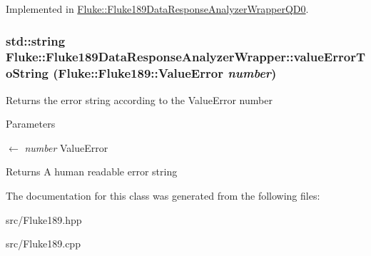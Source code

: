 Implemented in \hyperlink{classFluke_1_1Fluke189DataResponseAnalyzerWrapperQD0_a97829a1943b858fd09c4fef1d6d61420}{Fluke::Fluke189DataResponseAnalyzerWrapperQD0}.\hypertarget{classFluke_1_1Fluke189DataResponseAnalyzerWrapper_ac6af92576728d360cf3e0d462d07dd27}{
\subsubsection[{valueErrorToString}]{\setlength{\rightskip}{0pt plus 5cm}std::string Fluke::Fluke189DataResponseAnalyzerWrapper::valueErrorToString ({\bf Fluke::Fluke189::ValueError} {\em number})}}
\label{classFluke_1_1Fluke189DataResponseAnalyzerWrapper_ac6af92576728d360cf3e0d462d07dd27}
Returns the error string according to the ValueError number 
\begin{DoxyParams}{Parameters}
\item[\mbox{$\leftarrow$} {\em number}]ValueError \end{DoxyParams}
\begin{DoxyReturn}{Returns}
A human readable error string 
\end{DoxyReturn}


The documentation for this class was generated from the following files:\begin{DoxyCompactItemize}
\item 
src/Fluke189.hpp\item 
src/Fluke189.cpp\end{DoxyCompactItemize}
